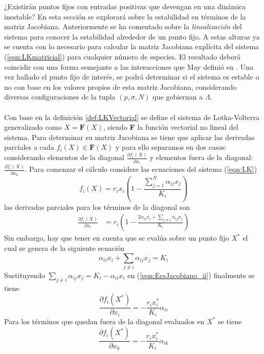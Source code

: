 ¿Existirán puntos fijos con entradas positivas que devengan en una dinámica inestable? En esta sección se explorará sobre la estabilidad en términos de la matriz Jacobiana. Anteriormente se ha comentado sobre la \textit{linealización} del sistema para conocer la estabilidad alrededor de un punto fijo. A estas alturas ya se cuenta con lo necesario para calcular la matriz Jacobiana explícita del sistema (\ref{eqn:LKmatricial}) para cualquier número de especies. El resultado deberá coincidir con una forma semejante a las interacciones que May definió en \cite{may2019stability}. Una vez hallado el punto fijo de interés, se podrá determinar si el sistema es estable o no con base en los valores propios de esta matriz Jacobiana, considerando diversas configuraciones de la tupla $(p,\sigma,N)$ que gobiernan a $\Lambda$.\\
\\
Con base en la definición \ref{def:LKVectorial} se define el sistema de Lotka-Volterra generalizado como $\dot{X}=\textbf{F}(X)$, siendo \textbf{F} la función vectorial no lineal del sistema. Para determinar su matriz Jacobiana se tiene que aplicar las derivadas parciales a cada $f_i(X)\in\mathbf{F}(X)$ y para ello separamos en dos casos: considerando elementos de la diagonal $\frac{\partial f_i(X)}{\partial x_i}$ y elementos fuera de la diagonal: $\frac{\partial f_i(X)}{\partial x_k}$. Para comenzar el cálculo considere las ecuaciones del sistema (\ref{eqn:LK}) 
$$
f_i(X) = r_ix_i\left (1-\frac{\sum_{j=1}^N \alpha_{ij}x_j}{K_i}\right )
$$
las derivadas parciales para los términos de la diagonal son
\begin{equation}\label{eqn:EcsJacobiano_ii}
	\begin{split}
			\frac{\partial f_i(X)}{\partial x_i} &= r_i \left (1-\frac{2\alpha_{ii}x_i+\sum_{j\neq i}\alpha_{ij}x_j}{K_i}\right )
	\end{split}
\end{equation}
Sin embargo, hay que tener en cuenta que se evalúa sobre un punto fijo $X^*$ el cual se genera de la siguiente ecuación  
$$\alpha_{ii}x_i+\sum_{j\neq i}\alpha_{ij}x_j=K_i$$
Sustituyendo $\sum_{j\neq i}\alpha_{ij}x_j=K_i-\alpha_{ii}x_i$ en (\ref{eqn:EcsJacobiano_ii}) finalmente se tiene
$$\frac{\partial f_i(X^*)}{\partial x_i} = -\frac{r_ix_i^*}{K_i}\alpha_{ii}$$
Para los términos que quedan fuera de la diagonal evaluados en $X^*$ se tiene
$$\frac{\partial f_i(X^*)}{\partial x_k} = -\frac{r_ix_i^*}{K_i}\alpha_{ik} $$
\newpage
